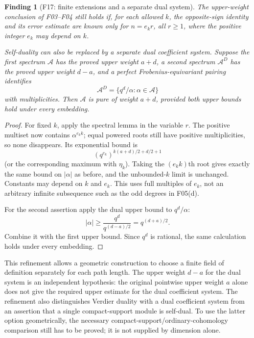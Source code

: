 \documentclass[11pt,a4paper]{article}
\newcommand{\fid}[1]{\textsf{#1}}\newcommand{\gate}[1]{\textsf{#1}}
\theoremstyle{named}\newtheorem{finding}{Finding}[section]
\theoremstyle{definition}\newtheorem{definition}[finding]{Definition}
\theoremstyle{remark}\newtheorem{remark}[finding]{Remark}
\begin{document}
\begin{finding}[\fid{F17}: finite extensions and a separate dual system]\label{f:extensiondual}
The upper-weight conclusion of \fid{F03}--\fid{F04} still holds if, for each allowed $k$, the opposite-sign identity and its error estimate are known only for $n=e_kr$, all $r\ge1$, where the positive integer $e_k$ may depend on $k$.

Self-duality can also be replaced by a separate dual coefficient system. Suppose the first spectrum $\mathcal A$ has the proved upper weight $a+d$, a second spectrum $\mathcal A^D$ has the proved upper weight $d-a$, and a perfect Frobenius-equivariant pairing identifies
\[
 \mathcal A^D=\{q^d/\alpha:\alpha\in\mathcal A\}
\]
with multiplicities. Then $\mathcal A$ is pure of weight $a+d$, provided both upper bounds hold under every embedding.
\end{finding}
\begin{proof}
For fixed $k$, apply the spectral lemma in the variable $r$. The positive multiset now contains $\alpha^{e_kk}$; equal powered roots still have positive multiplicities, so none disappears. Its exponential bound is
\[
 (q^{e_k})^{k(a+d)/2+d/2+1}
\]
(or the corresponding maximum with $\eta_k$). Taking the $(e_kk)$th root gives exactly the same bound on $|\alpha|$ as before, and the unbounded-$k$ limit is unchanged. Constants may depend on $k$ and $e_k$. This uses full multiples of $e_k$, not an arbitrary infinite subsequence such as the odd degrees in \fid{F05}(d).

For the second assertion apply the dual upper bound to $q^d/\alpha$:
\[
 |\alpha|\ge\frac{q^d}{q^{(d-a)/2}}=q^{(d+a)/2}.
\]
Combine it with the first upper bound. Since $q^d$ is rational, the same calculation holds under every embedding.
\end{proof}
This refinement allows a geometric construction to choose a finite field of definition separately for each path length. The upper weight $d-a$ for the dual system is an independent hypothesis: the original pointwise upper weight $a$ alone does not give the required upper estimate for the dual coefficient system. The refinement also distinguishes Verdier duality with a dual coefficient system from an assertion that a single compact-support module is self-dual. To use the latter option geometrically, the necessary compact-support/ordinary-cohomology comparison still has to be proved; it is not supplied by dimension alone.
\end{document}
